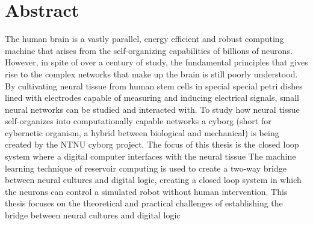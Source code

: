 \section*{\Huge Abstract}

The human brain is a vastly parallel, energy efficient and robust computing
machine that arises from the self-organizing capabilities of billions of neurons.
However, in spite of over a century of study, the fundamental principles that
gives rise to the complex networks that make up the brain is still poorly
understood.
%
By cultivating neural tissue from human stem cells in special special petri
dishes lined with electrodes capable of measuring and inducing electrical
signals, small neural networks can be studied and interacted with.
%
To study how neural tissue self-organizes into computationally capable networks
a cyborg (short for cybernetic organism, a hybrid between biological and
mechanical) is being created by the NTNU cyborg project.
%
The focus of this thesis is the closed loop system where a digital computer
interfaces with the neural tissue 
%
The machine learning technique of reservoir computing is used to create a
two-way bridge between neural cultures and digital logic, creating a closed loop
system in which the neurons can control a simulated robot without human intervention.
%
This thesis focuses on the theoretical and practical challenges of establishing
the bridge between neural cultures and digital logic
